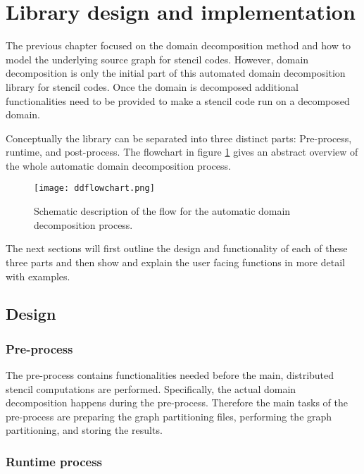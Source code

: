 \section{Library design and implementation}
The previous chapter focused on the domain decomposition method and how to model the underlying source graph for stencil codes.
However, domain decomposition is only the initial part of this automated domain decomposition library for stencil codes.
Once the domain is decomposed additional functionalities need to be provided to make a stencil code run on a decomposed domain.

Conceptually the library can be separated into three distinct parts:
Pre-process, runtime, and post-process.
The flowchart in figure \ref{fig:library_flowchart} gives an abstract overview of the whole automatic domain decomposition process.

\begin{figure}
\centering
\texttt{[image: ddflowchart.png]}
\caption{Schematic description of the flow for the automatic domain decomposition process.}
\label{fig:library_flowchart}
\end{figure}

The next sections will first outline the design and functionality of each of these three parts and then show and explain the user facing functions in more detail with examples.

\subsection{Design}
\subsubsection{Pre-process}
The pre-process contains functionalities needed before the main, distributed stencil computations are performed.
Specifically, the actual domain decomposition happens during the pre-process.
Therefore the main tasks of the pre-process are preparing the graph partitioning files, performing the graph partitioning, and storing the results.

\subsubsection{Runtime process}

